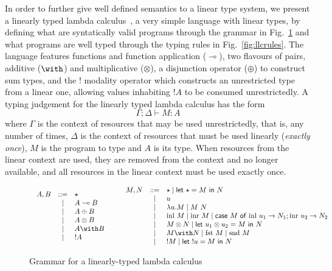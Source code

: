 \documentclass[]{lwnovathesis}
\newcommand{\lolli}{\multimap}
\newcommand{\tensor}{\otimes}
\newcommand{\bang}{{!}}
\newcommand{\llet}[2]{\mathsf{let}~#1~\mathsf{in}~#2}
\newcommand{\ccase}[2]{\mathsf{case}~#1~\mathsf{of}~#2}
\begin{document}

In order to further give well defined semantics to a linear type system, we
present a linearly typed lambda calculus~\cite{}, a very
simple language with linear types, by defining what are syntatically valid
programs through the grammar in Fig.~\ref{fig:llcgrammar} and what programs are
well typed through the typing rules in Fig.~\ref{fig:llcrules}. The language
features functions and function application ($\lolli$), two flavours of pairs,
additive ($\with$) and multiplicative ($\tensor$), a disjunction operator
($\oplus$) to construct sum types, and the $\bang$ modality operator which
constructs an unrestricted type from a linear one, allowing values inhabiting
$\bang A$ to be consumed unrestrictedly. A typing judgement for the linearly typed
lambda calculus has the form
%
\[ \Gamma; \Delta \vdash M : A \]
%
where $\Gamma$ is the context of resources that may be used unrestrictedly, that
is, any number of times, $\Delta$ is the context of resources that must be used
linearly (\emph{exactly once}), $M$ is the program to type and $A$ is its type.
When resources from the linear context are used, they are removed from the
context and no longer available, and all resources in the linear context must be
used exactly once.


\begin{figure}[h]
\[
\begin{array}{c}
  \begin{array}{lcl}
    A,B & ::= & \star\\
        & \mid & A \lolli B\\
        & \mid & A \oplus B\\
        & \mid & A \tensor B\\
        & \mid & A \with B\\
        & \mid & \bang A\\
   \end{array}
\qquad
  \begin{array}{lcl}
      M,N & ::= & \star \mid \llet{\star = M}{N} \\
        & \mid & u \\
        & \mid & \lambda u. M \mid M~N\\
        & \mid & \textrm{inl}~M \mid \textrm{inr}~M \mid
        \ccase{M}{\textrm{inl}~u_1 \to N_1;\textrm{inr}~u_2 \to N_2}\\
        & \mid & M \tensor N \mid \llet{u_1 \tensor u_2 = M}{N}\\
        & \mid & M \with N \mid \textrm{fst}~M \mid \textrm{snd}~M \\
        & \mid & \bang M \mid \llet{!u = M}{N} \\
   \end{array}
\end{array}
\]
\caption{Grammar for a linearly-typed lambda calculus}
\label{fig:llcgrammar}
\end{figure}
\end{document}
